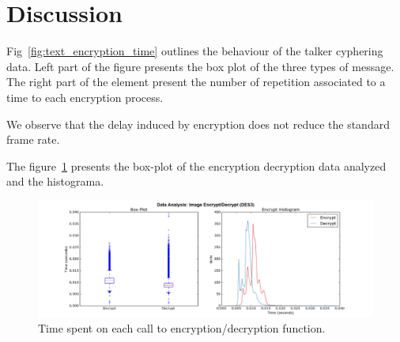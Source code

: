 \documentclass[journal,twoside]{JoPhA}
\begin{document}
\section{Discussion}

Fig~\ref{fig:text_encryption_time} outlines the behaviour of the talker cyphering data. Left part of the figure presents the box plot of the three types of message. The right part of the element present the number of repetition associated to a time to each encryption process.


We observe that the delay induced by encryption does not reduce the standard frame rate. 

The figure~\ref{fig:images_encryption} presents the box-plot of the encryption decryption data analyzed and the histograma. 

\begin{figure}[ht]
    \centering
    \includegraphics[width=.9\textwidth]{Outline_images_encryption_decrytiontime2.png}
    \caption{Time spent on each call to encryption/decryption function.}
  \label{fig:images_encryption}
\end{figure}
% 
% 
% 
% 
\end{document}
